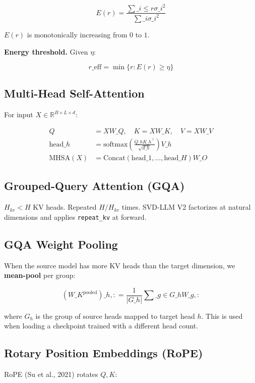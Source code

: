 \[
E(r) = \frac{\sum\_{i \leq r} \sigma\_i^2}{\sum\_i \sigma\_i^2}
\tag{3.6}
\]

$E(r)$ is monotonically increasing from $0$ to $1$.

\textbf{Energy threshold.} Given $\eta$:

\[
r\_\text{eff} = \min\{r : E(r) \geq \eta\}
\tag{3.7}
\]

\subsection{Multi-Head Self-Attention}

For input $X \in \mathbb{R}^{B \times L \times d}$:

\[
\begin{aligned}
Q &= X W\_Q, \quad K = X W\_K, \quad V = X W\_V \\
\text{head}\_h &= \text{softmax}\!\left(\frac{Q\_h K\_h^\top}{\sqrt{d\_h}}\right) V\_h \\
\text{MHSA}(X) &= \text{Concat}(\text{head}\_1, \dots, \text{head}\_H) W\_O
\end{aligned}
\tag{3.8}
\]

\subsection{Grouped-Query Attention (GQA)}

$H_{kv} < H$ KV heads. Repeated $H / H_{kv}$ times. SVD-LLM V2 factorizes at 
natural dimensions and applies \texttt{repeat\_kv} at forward.

\subsection{GQA Weight Pooling}

When the source model has more KV heads than the target dimension, we 
\textbf{mean-pool} per group:

\[
(W\_K^{\text{pooled}})\_{h, :} = \frac{1}{|G\_h|} \sum\_{g \in G\_h} W\_{g, :}
\tag{3.9}
\]

where $G_h$ is the group of source heads mapped to target head $h$. This is 
used when loading a checkpoint trained with a different head count.

\subsection{Rotary Position Embeddings (RoPE)}

RoPE (Su et al., 2021) rotates $Q, K$:

